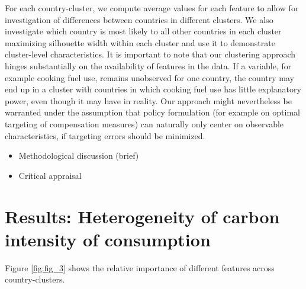 \documentclass[12pt, a4paper]{article}
\begin{document}
For each country-cluster, we compute average values for each feature to allow for investigation of differences between countries in different clusters. We also investigate which country is most likely to all other countries in each cluster maximizing silhouette width within each cluster and use it to demonstrate cluster-level characteristics. It is important to note that our clustering approach hinges substantially on the availability of features in the data. If a variable, for example cooking fuel use, remains unobserved for one country, the country may end up in a cluster with countries in which cooking fuel use has little explanatory power, even though it may have in reality. Our approach might nevertheless be warranted under the assumption that policy formulation (for example on optimal targeting of compensation measures) can naturally only center on observable characteristics, if targeting errors should be minimized.


\begin{itemize}
    \item Methodological discussion (brief)
    \item Critical appraisal
\end{itemize}

\clearpage

\section{Results: Heterogeneity of carbon intensity of consumption} \label{sec:results}

Figure \ref{fig:fig_3} shows the relative importance of different features across country-clusters. %
\end{document}
